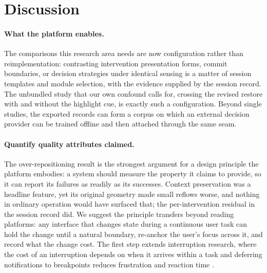 \section{Discussion}
\label{sec:discussion}

\paragraph{What the platform enables.}
The comparisons this research area needs are now configuration rather than reimplementation: contrasting intervention presentation forms, commit boundaries, or decision strategies under identical sensing is a matter of session templates and module selection, with the evidence supplied by the session record.
The unbundled study that our own confound calls for, crossing the revised restore with and without the highlight cue, is exactly such a configuration.
Beyond single studies, the exported records can form a corpus on which an external decision provider can be trained offline and then attached through the same seam. %

\paragraph{Quantify quality attributes claimed.}
The over-repositioning result is the strongest argument for a design principle the platform embodies: a system should measure the property it claims to provide, so it can report its failures as readily as its successes.
Context preservation was a headline feature, yet its original geometry made small reflows worse, and nothing in ordinary operation would have surfaced that; the per-intervention residual in the session record did.
We suggest the principle transfers beyond reading platforms: any interface that changes state during a continuous user task can hold the change until a natural boundary, re-anchor the user's focus across it, and record what the change cost.
The first step extends interruption research, where the cost of an interruption depends on when it arrives within a task \cite{adamczyk2004interruption} and deferring notifications to breakpoints reduces frustration and reaction time \cite{iqbal2008notification}.

